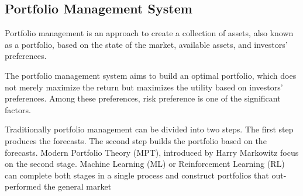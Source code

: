 \subsection {Portfolio Management System}
Portfolio management is an approach to create a collection of assets, also known as a portfolio, based on the state of the market, available assets, and investors' preferences.

The portfolio management system aims to build an optimal portfolio, which does not merely maximize the return but maximizes the utility based on investors' preferences. Among these preferences, risk preference is one of the significant factors.

Traditionally portfolio management can be divided into two steps. The first step produces the forecasts. The second step builds the portfolio based on the forecasts.  Modern Portfolio Theory (MPT), introduced by  Harry Markowitz \cite{10.2307/2975974} focus on the second stage. Machine Learning (ML) or Reinforcement Learning (RL) can complete both stages in a single process and construct portfolios that out-performed the general market\cite{KRAUSS2017689, moody2001learning}
